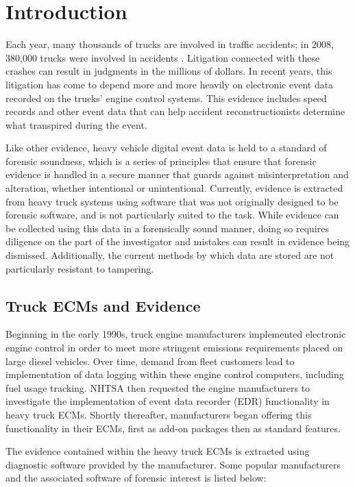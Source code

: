 \chapter{Introduction}
Each year, many thousands of trucks are involved in traffic accidents; in 2008, 380,000 trucks were involved in accidents \cite{NHTSA2008}.
Litigation connected with these crashes can result in judgments in the millions of dollars. In recent years, this litigation has 
come to depend more and more heavily on electronic event data recorded on the trucks' engine control systems. 
This evidence includes speed records and other event data that can help accident reconstructionists 
determine what transpired during the event.

Like other evidence, heavy vehicle digital event data is held to a standard of forensic soundness, which is a series of principles 
that ensure that forensic evidence is handled in a secure manner that guards against misinterpretation and alteration, whether intentional
or unintentional.
Currently, evidence is extracted from heavy truck systems using software that was not originally designed to be 
forensic software, and is not particularly suited to the task. While evidence can be collected using this data in a forensically sound 
manner, doing so requires diligence on the part of the investigator and mistakes can result in evidence being dismissed. Additionally, 
the current methods by which data are stored are not particularly resistant to tampering. 

\section{Truck ECMs and Evidence}

Beginning in the early 1990s, truck engine manufacturers implemented electronic engine control in order to meet more stringent emissions
requirements placed on large diesel vehicles. Over time, demand from fleet customers lead to implementation of data logging within these
engine control computers, including fuel usage tracking. NHTSA then requested the engine manufacturers to investigate the implementation
of event data recorder (EDR) functionality in heavy truck ECMs. Shortly thereafter, manufacturers began offering this functionality in their
ECMs, first as add-on packages then as standard features.

The evidence contained within the heavy truck ECMs is extracted using diagnostic software provided by the manufacturer. Some popular
manufacturers and the associated software of forensic interest is listed below:

